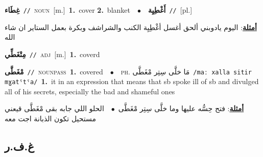 \documentclass[10pt,a4paper,twoside]{article} %
\begin{document}
\begin{multicols}{2}
{\setlength\topsep{0pt}\textbf{\foreignlanguage{arabic}{غِطَاء}}\ {\color{gray}\texttt{//}\color{black}}\ \textsc{noun}\ [m.]\ \textbf{1.}~cover  \textbf{2.}~blanket\ \ $\bullet$\ \ \setlength\topsep{0pt}\textbf{\foreignlanguage{arabic}{أَغْطِيِة}}\ {\color{gray}\texttt{//}\color{black}}\ [pl.]\  \begin{flushright}\color{gray}\foreignlanguage{arabic}{\textbf{\underline{\foreignlanguage{arabic}{أمثلة}}}: اليوم يادوبني ألحق أغسل أغْطِيِة الكنب والشراشف وبكرة بعمل الستاير ان شاء الله}\end{flushright}\color{black}} \vspace{2mm}

{\setlength\topsep{0pt}\textbf{\foreignlanguage{arabic}{مِتْغَطِّي}}\ {\color{gray}\texttt{//}\color{black}}\ \textsc{adj}\ [m.]\ \textbf{1.}~coverd\ } \vspace{2mm}

{\setlength\topsep{0pt}\textbf{\foreignlanguage{arabic}{مْغَطَّى}}\ {\color{gray}\texttt{//}\color{black}}\ \textsc{noun\textunderscore pass}\ \textbf{1.}~covered\ \ $\bullet$\ \ \textsc{ph.} \color{gray} \foreignlanguage{arabic}{مَا خلَّى سِتِر مْغَطَّى}\color{black}\ {\color{gray}\texttt{/{\sffamily maː xalla sitir mɣatˤtˤa}/}\color{black}}\ \textbf{1.}~it in an expression that means that sb spoke ill of sb and divulged all of his secrets, especially the bad and shameful ones\  \begin{flushright}\color{gray}\foreignlanguage{arabic}{\textbf{\underline{\foreignlanguage{arabic}{أمثلة}}}: فتح حِسُّه عليها وما خلَّى سِتِر مْغَطَّى\ $\bullet$\ \  الحلو اللي جابه بقى مْغَطَّى قيعني مستحيل تكون الذبانة اجت معه}\end{flushright}\color{black}} \vspace{2mm}

\vspace{-3mm}
\subsection*{\color{blue}\foreignlanguage{arabic}{غ.ف.ر}\color{blue}{}} 


\end{multicols}
\end{document}
